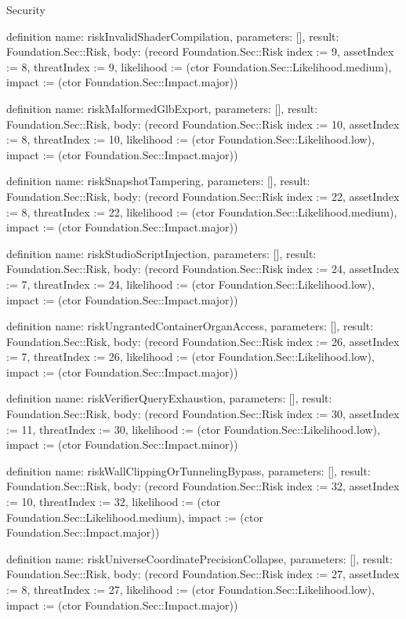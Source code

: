 \begin{lexlean}{Security}
\begin{semanticmodule}
definition{
  name: riskInvalidShaderCompilation,
  parameters: [],
  result: Foundation.Sec::Risk,
  body: (record Foundation.Sec::Risk {index := 9, assetIndex := 8, threatIndex := 9, likelihood := (ctor Foundation.Sec::Likelihood.medium), impact := (ctor Foundation.Sec::Impact.major)})
}

definition{
  name: riskMalformedGlbExport,
  parameters: [],
  result: Foundation.Sec::Risk,
  body: (record Foundation.Sec::Risk {index := 10, assetIndex := 8, threatIndex := 10, likelihood := (ctor Foundation.Sec::Likelihood.low), impact := (ctor Foundation.Sec::Impact.major)})
}

definition{
  name: riskSnapshotTampering,
  parameters: [],
  result: Foundation.Sec::Risk,
  body: (record Foundation.Sec::Risk {index := 22, assetIndex := 8, threatIndex := 22, likelihood := (ctor Foundation.Sec::Likelihood.medium), impact := (ctor Foundation.Sec::Impact.major)})
}

definition{
  name: riskStudioScriptInjection,
  parameters: [],
  result: Foundation.Sec::Risk,
  body: (record Foundation.Sec::Risk {index := 24, assetIndex := 7, threatIndex := 24, likelihood := (ctor Foundation.Sec::Likelihood.low), impact := (ctor Foundation.Sec::Impact.major)})
}

definition{
  name: riskUngrantedContainerOrganAccess,
  parameters: [],
  result: Foundation.Sec::Risk,
  body: (record Foundation.Sec::Risk {index := 26, assetIndex := 7, threatIndex := 26, likelihood := (ctor Foundation.Sec::Likelihood.low), impact := (ctor Foundation.Sec::Impact.major)})
}

definition{
  name: riskVerifierQueryExhaustion,
  parameters: [],
  result: Foundation.Sec::Risk,
  body: (record Foundation.Sec::Risk {index := 30, assetIndex := 11, threatIndex := 30, likelihood := (ctor Foundation.Sec::Likelihood.low), impact := (ctor Foundation.Sec::Impact.minor)})
}

definition{
  name: riskWallClippingOrTunnelingBypass,
  parameters: [],
  result: Foundation.Sec::Risk,
  body: (record Foundation.Sec::Risk {index := 32, assetIndex := 10, threatIndex := 32, likelihood := (ctor Foundation.Sec::Likelihood.medium), impact := (ctor Foundation.Sec::Impact.major)})
}

definition{
  name: riskUniverseCoordinatePrecisionCollapse,
  parameters: [],
  result: Foundation.Sec::Risk,
  body: (record Foundation.Sec::Risk {index := 27, assetIndex := 8, threatIndex := 27, likelihood := (ctor Foundation.Sec::Likelihood.low), impact := (ctor Foundation.Sec::Impact.major)})
}


\end{semanticmodule}
\end{lexlean}
